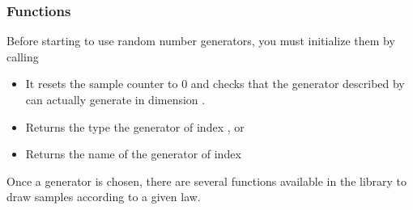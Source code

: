\subsubsection{Functions}

Before starting to use random number generators, you must initialize them by
calling 
\begin{itemize}
\item {}
  \sshortdescribe It resets the sample counter to $0$ and checks that the
  generator described by  can actually generate
   in dimension .
\end{itemize}

\begin{itemize}
  
\item {}
  \sshortdescribe Returns the type the generator of index , 
   or 
  
  
\item {}
  \sshortdescribe Returns the name of the generator of index 
\end{itemize}

Once a generator is chosen, there are several functions available in the
library to draw samples according to a given law. 

